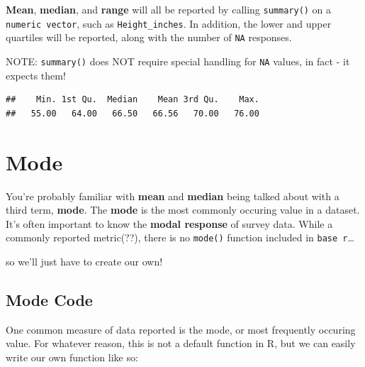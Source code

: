 \documentclass[
]{book}
\newenvironment{Shaded}{\begin{snugshade}}{\end{snugshade}}
\newcommand{\FunctionTok}[1]{\textcolor[rgb]{0.00,0.00,0.00}{#1}}
\newcommand{\NormalTok}[1]{#1}
\newcommand{\SpecialCharTok}[1]{\textcolor[rgb]{0.00,0.00,0.00}{#1}}
\begin{document}
\textbf{Mean}, \textbf{median}, and \textbf{range} will all be reported by calling \texttt{summary()} on a \texttt{numeric\ vector}, such as \texttt{Height\_inches}. In addition, the lower and upper quartiles will be reported, along with the number of \texttt{NA} responses.

NOTE: \texttt{summary()} does NOT require special handling for \texttt{NA} values, in fact - it expects them!

\begin{Shaded}
\end{Shaded}

\begin{verbatim}
##    Min. 1st Qu.  Median    Mean 3rd Qu.    Max. 
##   55.00   64.00   66.50   66.56   70.00   76.00
\end{verbatim}

\hypertarget{mode}{%
\section{Mode}\label{mode}}

You're probably familiar with \textbf{mean} and \textbf{median} being talked about with a
third term, \textbf{mode}. The \textbf{mode} is the most commonly occuring value in a
dataset. It's often important to know the \textbf{modal response} of survey data.
While a commonly reported metric(??), there is no \texttt{mode()} function included in
\texttt{base\ r}\ldots{}

so we'll just have to create our own!

\hypertarget{mode-code}{%
\subsection{Mode Code}\label{mode-code}}

One common measure of data reported is the mode, or most frequently occuring value. For whatever reason, this is not a default function in R, but we can easily write our own function like so:
\end{document}
